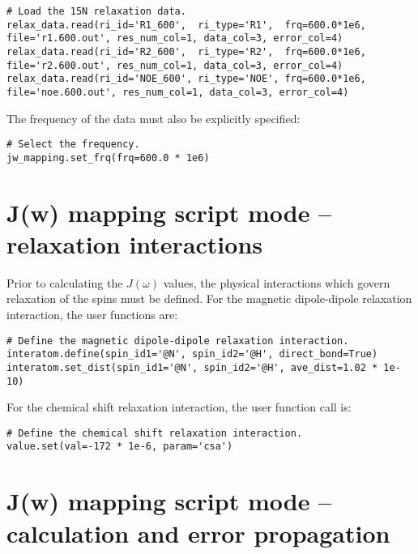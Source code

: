\begin{lstlisting}[firstnumber=13]
# Load the 15N relaxation data.
relax_data.read(ri_id='R1_600',  ri_type='R1',  frq=600.0*1e6, file='r1.600.out', res_num_col=1, data_col=3, error_col=4)
relax_data.read(ri_id='R2_600',  ri_type='R2',  frq=600.0*1e6, file='r2.600.out', res_num_col=1, data_col=3, error_col=4)
relax_data.read(ri_id='NOE_600', ri_type='NOE', frq=600.0*1e6, file='noe.600.out', res_num_col=1, data_col=3, error_col=4)
\end{lstlisting}

The frequency of the data must also be explicitly specified:

\begin{lstlisting}[firstnumber=28]
# Select the frequency.
jw_mapping.set_frq(frq=600.0 * 1e6)
\end{lstlisting}




\section{J(w) mapping script mode -- relaxation interactions}

Prior to calculating the $J(\omega)$ values, the physical interactions which govern relaxation of the spins must be defined.
For the magnetic dipole-dipole relaxation interaction, the user functions are:

\begin{lstlisting}[firstnumber=21]
# Define the magnetic dipole-dipole relaxation interaction.
interatom.define(spin_id1='@N', spin_id2='@H', direct_bond=True)
interatom.set_dist(spin_id1='@N', spin_id2='@H', ave_dist=1.02 * 1e-10)
\end{lstlisting}

For the chemical shift relaxation interaction, the user function call is:

\begin{lstlisting}[firstnumber=25]
# Define the chemical shift relaxation interaction.
value.set(val=-172 * 1e-6, param='csa')
\end{lstlisting}




\section{J(w) mapping script mode -- calculation and error propagation}

